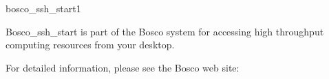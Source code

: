 \begin{ManPage}{\label{man-bosco-ssh-start}bosco\_ssh\_start}{1}
{Bosco\_ssh\_start is part of the Bosco system for accessing high
throughput computing resources from your desktop.

For detailed information, please see the Bosco web site:
}


\end{ManPage}
